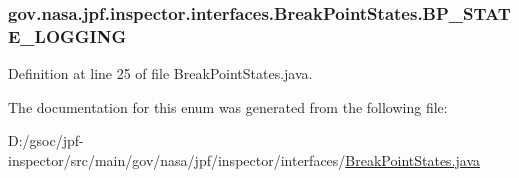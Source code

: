 \subsubsection[{\texorpdfstring{B\+P\+\_\+\+S\+T\+A\+T\+E\+\_\+\+L\+O\+G\+G\+I\+NG}{BP_STATE_LOGGING}}]{\setlength{\rightskip}{0pt plus 5cm}gov.\+nasa.\+jpf.\+inspector.\+interfaces.\+Break\+Point\+States.\+B\+P\+\_\+\+S\+T\+A\+T\+E\+\_\+\+L\+O\+G\+G\+I\+NG}\hypertarget{enumgov_1_1nasa_1_1jpf_1_1inspector_1_1interfaces_1_1_break_point_states_ae881aa2d81965de8cca2c1d2fac0b504}{}\label{enumgov_1_1nasa_1_1jpf_1_1inspector_1_1interfaces_1_1_break_point_states_ae881aa2d81965de8cca2c1d2fac0b504}


Definition at line 25 of file Break\+Point\+States.\+java.



The documentation for this enum was generated from the following file\+:\begin{DoxyCompactItemize}
\item 
D\+:/gsoc/jpf-\/inspector/src/main/gov/nasa/jpf/inspector/interfaces/\hyperlink{_break_point_states_8java}{Break\+Point\+States.\+java}\end{DoxyCompactItemize}
